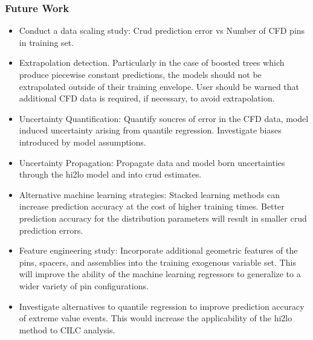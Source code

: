\documentclass[t, pdftex]{beamer}
\makeatletter
\def\beamer@writeslidentry@miniframesoff{%
    \expandafter\beamer@ifempty\expandafter{\beamer@framestartpage}{}%
    {%
        \clearpage\beamer@notesactions%
    }
}
\newcommand*{\miniframesoff}{\let\beamer@writeslidentry=\beamer@writeslidentry@miniframesoff}
\makeatother
\begin{document}
\begin{frame}[shrink=10]
\frametitle{Future Work}
\scriptsize{
\begin{itemize}
    \item Conduct a data scaling study:  Crud prediction error vs Number of CFD pins in training set.
    \item Extrapolation detection.  Particularly in the case of boosted trees which produce piecewise constant predictions, the models should not be extrapolated outside of their training envelope.  User should be warned that additional CFD data is required, if necessary, to avoid extrapolation.
    \item Uncertainty Quantification:  Quantify soucres of error in the CFD data, model induced uncertainty arising from quantile regression.  Investigate biases introduced by model assumptions.
    \item Uncertainty Propagation:  Propagate data and model born uncertainties through the hi2lo model and into crud estimates.
    \item Alternative machine learning strategies:  Stacked learning methods can increase prediction accuracy at the cost of higher training times.  Better prediction accuracy for the distribution parameters will result in smaller crud prediction errors.
    \item Feature engineering study:  Incorporate additional geometric features of the pins, spacers, and assemblies into the training exogenous variable set.  This will improve the ability of the machine learning regressors to generalize to a wider variety of pin configurations.
    \item Investigate alternatives to quantile regression to improve prediction accuracy of extreme value events.  This would increase the applicability of the hi2lo method to CILC analysis.
\end{itemize}
}
\end{frame}

\miniframesoff
\lastframe%

\end{document}
